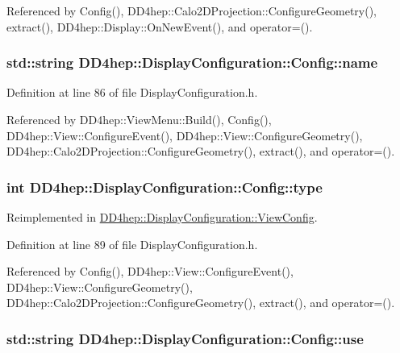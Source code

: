 Referenced by Config(), DD4hep::Calo2DProjection::ConfigureGeometry(), extract(), DD4hep::Display::OnNewEvent(), and operator=().\hypertarget{class_d_d4hep_1_1_display_configuration_1_1_config_adefaa09fe7cde3bb7330de97cf07a1ba}{
\subsubsection[{name}]{\setlength{\rightskip}{0pt plus 5cm}std::string {\bf DD4hep::DisplayConfiguration::Config::name}}}
\label{class_d_d4hep_1_1_display_configuration_1_1_config_adefaa09fe7cde3bb7330de97cf07a1ba}


Definition at line 86 of file DisplayConfiguration.h.

Referenced by DD4hep::ViewMenu::Build(), Config(), DD4hep::View::ConfigureEvent(), DD4hep::View::ConfigureGeometry(), DD4hep::Calo2DProjection::ConfigureGeometry(), extract(), and operator=().\hypertarget{class_d_d4hep_1_1_display_configuration_1_1_config_a39e4104003d0a6fe90053120cc97fd60}{
\subsubsection[{type}]{\setlength{\rightskip}{0pt plus 5cm}int {\bf DD4hep::DisplayConfiguration::Config::type}}}
\label{class_d_d4hep_1_1_display_configuration_1_1_config_a39e4104003d0a6fe90053120cc97fd60}


Reimplemented in \hyperlink{class_d_d4hep_1_1_display_configuration_1_1_view_config_ae02fb914afdda0a021ff81d40c928844}{DD4hep::DisplayConfiguration::ViewConfig}.

Definition at line 89 of file DisplayConfiguration.h.

Referenced by Config(), DD4hep::View::ConfigureEvent(), DD4hep::View::ConfigureGeometry(), DD4hep::Calo2DProjection::ConfigureGeometry(), extract(), and operator=().\hypertarget{class_d_d4hep_1_1_display_configuration_1_1_config_a2b092695528d45417dfeeb376993d5cb}{
\subsubsection[{use}]{\setlength{\rightskip}{0pt plus 5cm}std::string {\bf DD4hep::DisplayConfiguration::Config::use}}}
\label{class_d_d4hep_1_1_display_configuration_1_1_config_a2b092695528d45417dfeeb376993d5cb}


